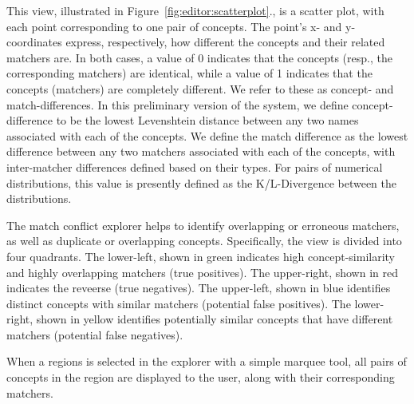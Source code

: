 This view, illustrated in Figure~\ref{fig:editor:scatterplot}., is a scatter plot, with each point corresponding to one pair of concepts.
The point's x- and y-coordinates express, respectively, how different the concepts and their related matchers are.
In both cases, a value of 0 indicates that the concepts (resp., the corresponding matchers) are identical, while a value of 1 indicates that the concepts (matchers) are completely different.
We refer to these as concept- and match-differences.
In this preliminary version of the system, we define concept-difference to be the lowest Levenshtein distance between any two names associated with each of the concepts.
We define the match difference as the lowest difference between any two matchers associated with each of the concepts, with inter-matcher differences defined based on their types.
For pairs of numerical distributions, this value is presently defined as the K/L-Divergence between the distributions.

The match conflict explorer helps to identify overlapping or erroneous matchers, as well as duplicate or overlapping concepts.
Specifically, the view is divided into four quadrants.  The lower-left, shown in green indicates high concept-similarity and highly overlapping matchers (true positives).  
The upper-right, shown in red indicates the reveerse (true negatives).
The upper-left, shown in blue identifies distinct concepts with similar matchers (potential false positives).  
The lower-right, shown in yellow identifies potentially similar concepts that have different matchers (potential false negatives).

When a regions is selected in the explorer with a simple marquee tool, all pairs of concepts in the region are displayed to the user, along with their corresponding matchers.



